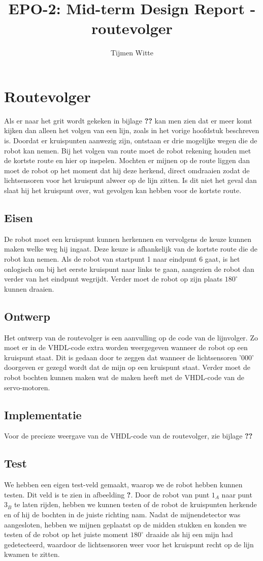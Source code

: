 \documentclass{report}
\title{EPO-2: Mid-term Design Report - routevolger}
\author{Tijmen Witte}
\begin{document}
\chapter{Routevolger}
\label{ch:probleem}

Als er naar het grit wordt gekeken in bijlage \textbf{??} kan men zien dat er meer komt kijken dan alleen het volgen van een lijn, zoals in het vorige hoofdstuk beschreven is. Doordat er kruispunten aanwezig zijn, ontstaan er drie mogelijke wegen die de robot kan nemen. Bij het volgen van route moet de robot rekening houden met de kortste route en hier op inspelen. Mochten er mijnen op de route liggen dan moet de robot op het moment dat hij deze herkend, direct omdraaien zodat de lichtsensoren voor het kruispunt alweer op de lijn zitten. Is dit niet het geval dan slaat hij het kruispunt over, wat gevolgen kan hebben voor de kortste route.   

\section{Eisen}
De robot moet een kruispunt kunnen herkennen en vervolgens de keuze kunnen maken welke weg hij ingaat. Deze keuze is afhankelijk van de kortste route die de robot kan nemen. Als de robot van startpunt 1 naar eindpunt 6 gaat, is het onlogisch om bij het eerste kruispunt naar links te gaan, aangezien de robot dan verder van het eindpunt wegrijdt. Verder moet de robot op zijn plaats $180^\circ$ kunnen draaien.

\section{Ontwerp}
Het ontwerp van de routevolger is een aanvulling op de code van de lijnvolger. Zo moet er in de VHDL-code extra worden weergegeven wanneer de robot op een kruispunt staat. Dit is gedaan door te zeggen dat wanneer de lichtsensoren '000' doorgeven er gezegd wordt dat de mijn op een kruispunt staat. Verder moet de robot bochten kunnen maken wat de maken heeft met de VHDL-code van de servo-motoren.

\section{Implementatie}
Voor de precieze weergave van de VHDL-code van de routevolger, zie bijlage\textbf{ ??}

\section{Test}
We hebben een eigen test-veld gemaakt, waarop we de robot hebben kunnen testen. Dit veld is te zien in afbeelding \textbf{?}. Door de robot van punt $1_A$ naar punt $3_B$ te laten rijden, hebben we kunnen testen of de robot de kruispunten herkende en of hij de bochten in de juiste richting nam. Nadat de mijnendetector was aangesloten, hebben we mijnen geplaatst op de midden stukken en konden we testen of de robot op het juiste moment $180^\circ$ draaide als hij een mijn had gedetecteerd, waardoor de lichtsensoren weer voor het kruispunt  recht op de lijn kwamen te zitten.
\end{document}
